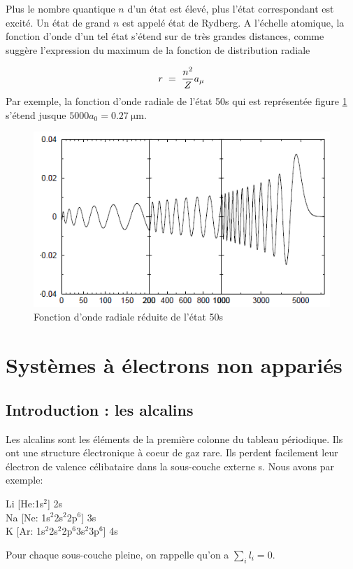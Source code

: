 Plus le nombre quantique $n$ d'un état est élevé, plus l'état correspondant est excité. Un état de grand $n$ est appelé état de Rydberg. A l'échelle atomique, la fonction d'onde d'un tel état s'étend sur de très grandes distances, comme suggère l'expression du maximum de la fonction de distribution radiale

\[
    r\; = \; \dfrac{n^2}{Z}a_{\mu}
\]
Par exemple, la fonction d'onde radiale de l'état 50s qui est représentée figure \ref{fig:50s} s'étend jusque $5000a_0=\SI{0.27}{\um}$.

\begin{figure}[tph]
    \centering
    \includegraphics{Images2/50s.PNG}
    \caption{Fonction d'onde radiale réduite de l'état 50s}
    \label{fig:50s}
\end{figure}



\newpage
\section{Systèmes à électrons non appariés}
\subsection{Introduction : les alcalins}
Les alcalins sont les éléments de la première colonne du tableau périodique. Ils ont une structure électronique à coeur de gaz rare. Ils perdent facilement leur électron de valence célibataire dans la sous-couche externe s. Nous avons par exemple:

\vspace{0.2cm}

\begin{center}
    Li [He:1s$^{2}$] 2s \\
    Na [Ne: 1s$^{2}$2s$^{2}$2p$^{6}$] 3s \\
    K [Ar: 1s$^{2}$2s$^{2}$2p$^{6}$3s$^{2}$3p$^{6}$] 4s
\end{center}
Pour chaque sous-couche pleine, on rappelle qu'on a $\sum_i l_i = 0$.

